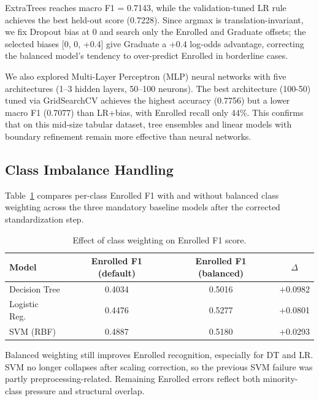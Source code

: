 \documentclass{article}
\begin{document}
ExtraTrees reaches macro F1 = 0.7143, while the validation-tuned LR rule achieves the best held-out score (0.7228). Since argmax is translation-invariant, we fix Dropout bias at 0 and search only the Enrolled and Graduate offsets; the selected biases [0, 0, +0.4] give Graduate a +0.4 log-odds advantage, correcting the balanced model's tendency to over-predict Enrolled in borderline cases.

We also explored Multi-Layer Perceptron (MLP) neural networks with five architectures (1--3 hidden layers, 50--100 neurons). The best architecture (100-50) tuned via GridSearchCV achieves the highest accuracy (0.7756) but a lower macro F1 (0.7077) than LR+bias, with Enrolled recall only 44\%. This confirms that on this mid-size tabular dataset, tree ensembles and linear models with boundary refinement remain more effective than neural networks.

\subsection{Class Imbalance Handling}

Table~\ref{tab:class_weight} compares per-class Enrolled F1 with and without balanced class weighting across the three mandatory baseline models after the corrected standardization step.

\begin{table}[H]
\centering
\caption{Effect of class weighting on Enrolled F1 score.}
\label{tab:class_weight}
\begin{minipage}{0.80\textwidth}
\centering
\begin{tabular}{@{}lccc@{}}
\toprule
Model & Enrolled F1 (default) & Enrolled F1 (balanced) & $\Delta$ \\
\midrule
Decision Tree & 0.4034 & 0.5016 & $+$0.0982 \\
Logistic Reg.\ & 0.4476 & 0.5277 & $+$0.0801 \\
SVM (RBF) & 0.4887 & 0.5180 & $+$0.0293 \\
\bottomrule
\end{tabular}
\end{minipage}
\end{table}

Balanced weighting still improves Enrolled recognition, especially for DT and LR. SVM no longer collapses after scaling correction, so the previous SVM failure was partly preprocessing-related. Remaining Enrolled errors reflect both minority-class pressure and structural overlap.
\end{document}
